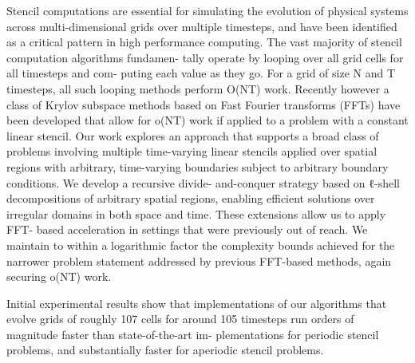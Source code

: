Stencil computations are essential for simulating the evolution
of physical systems across multi-dimensional grids over multiple
timesteps, and have been identified as a critical pattern in high performance computing.
The vast majority of stencil computation algorithms fundamen-
tally operate by looping over all grid cells for all timesteps and com-
puting each value as they go. For a grid of size N and T timesteps, all
such looping methods perform O(NT) work. 
Recently however a class of Krylov subspace methods based on 
Fast Fourier transforms (FFTs) have been developed that allow for o(NT) work if applied
to a problem with a constant linear stencil.
Our work explores an approach that supports a broad class
of problems involving multiple time-varying linear stencils applied
over spatial regions with arbitrary, time-varying boundaries subject
to arbitrary boundary conditions. We develop a recursive divide-
and-conquer strategy based on ℓ-shell decompositions of arbitrary
spatial regions, enabling efficient solutions over irregular domains
in both space and time. These extensions allow us to apply FFT-
based acceleration in settings that were previously out of reach.
We maintain to within a logarithmic factor the complexity bounds
achieved for the narrower problem statement addressed by previous
FFT-based methods, again securing o(NT) work.

Initial experimental results show that implementations of our
algorithms that evolve grids of roughly 107 cells for around 105
timesteps run orders of magnitude faster than state-of-the-art im-
plementations for periodic stencil problems, and substantially faster
for aperiodic stencil problems.
